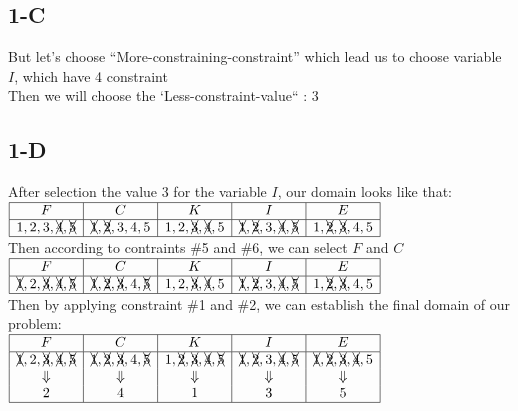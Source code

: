 \documentclass{article}
\begin{document}
        \subsection{1-C}
            But let's choose ``More-constraining-constraint'' which lead us to choose variable $I$, which have 4 constraint\\
            Then we will choose the `Less-constraint-value`` : 3
        \subsection{1-D}

            After selection the value 3 for the variable $I$, our domain looks like that:\\
            $\begin{array}{|c|c|c|c|c|}
                \hline
                F&C&K&I&E\\
                \hline
                1,2,3,\xcancel{4},\xcancel{5}&\xcancel{1},\xcancel{2},3,4,5&1,2,\xcancel{3},\xcancel{4},5&\xcancel{1},\xcancel{2},3,\xcancel{4},\xcancel{5}&1,\xcancel{2},\xcancel{3},4,5\\
                \hline
            \end{array}$\\

            Then according to contraints \#5 and \#6, we can select $F$ and $C$\\
            $\begin{array}{|c|c|c|c|c|}
                \hline
                F&C&K&I&E\\
                \hline
                \xcancel{1},2,\xcancel{3},\xcancel{4},\xcancel{5} & \xcancel{1},\xcancel{2},\xcancel{3},4,\xcancel{5} & 1,2,\xcancel{3},\xcancel{4},5 & \xcancel{1},\xcancel{2},3,\xcancel{4},\xcancel{5} & 1,\xcancel{2},\xcancel{3},4,5\\
                \hline
            \end{array}$\\

            Then by applying constraint \#1 and \#2, we can establish the final domain of our problem:\\
            $\begin{array}{|c|c|c|c|c|}
                \hline
                F&C&K&I&E\\
                \hline
                \xcancel{1},2,\xcancel{3},\xcancel{4},\xcancel{5} & \xcancel{1},\xcancel{2},\xcancel{3},4,\xcancel{5} & 1,\xcancel{2},\xcancel{3},\xcancel{4},\xcancel{5} & \xcancel{1},\xcancel{2},3,\xcancel{4},\xcancel{5} & \xcancel{1},\xcancel{2},\xcancel{3},\xcancel{4},5\\
                \Downarrow&\Downarrow&\Downarrow&\Downarrow&\Downarrow\\
                2&4&1&3&5\\
                \hline
            \end{array}$
    \newpage
\end{document}
